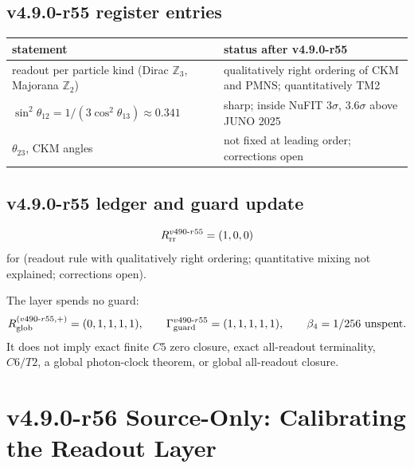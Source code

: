 \subsection*{v4.9.0-r55 register entries}
\label{subsec:v490-r55-register}

\begin{center}
\small
\begin{tabular}{@{}>{\raggedright\arraybackslash}p{}>{\raggedright\arraybackslash}p{}@{}}
\toprule
statement & status after v4.9.0-r55\\
\midrule
readout per particle kind (Dirac \(\mathbb Z_3\), Majorana \(\mathbb Z_2\)) & qualitatively right ordering of CKM and PMNS; quantitatively TM2\\
\(\sin^2\theta_{12}=1/(3\cos^2\theta_{13})\approx0.341\) & sharp; inside NuFIT \(3\sigma\), \(3.6\sigma\) above JUNO 2025\\
\(\theta_{23}\), CKM angles & not fixed at leading order; corrections open\\
\bottomrule
\end{tabular}
\end{center}

\subsection*{v4.9.0-r55 ledger and guard update}
\label{subsec:v490-r55-ledger-guard}

\[
R_{\rm rr}^{v490\text{-}r55}=(1,0,0)
\]
for (readout rule with qualitatively right ordering; quantitative mixing not explained; corrections open).

The layer spends no guard:
\[
R_{\rm glob}^{(v490\text{-}r55,+)}=(0,1,1,1,1),
\qquad
\Gamma_{\rm guard}^{v490\text{-}r55}=(1,1,1,1,1),
\qquad
\beta_4=1/256\ \text{unspent}.
\]
It does not imply exact finite \(C5\) zero closure, exact all-readout terminality,
\(C6/T2\), a global photon-clock theorem, or global all-readout closure.

\clearpage
\section*{v4.9.0-r56 Source-Only: Calibrating the Readout Layer}
\label{sec:v490-r56-readout-calibration}

